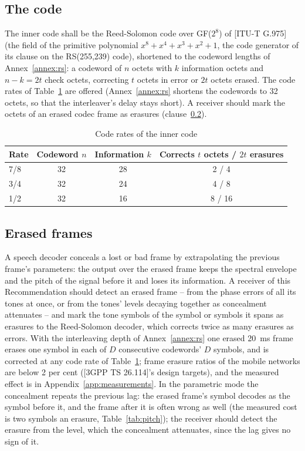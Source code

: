 \documentclass[a4paper,11pt]{article}
\newcounter{annex}
\newcommand{\rec}[1]{[ITU-T #1]}
\newcommand{\tgpp}[1]{[3GPP TS #1]}
\newcommand{\thd}[1]{\textbf{#1}}
\begin{document}
\subsection{The code}
The inner code shall be the Reed-Solomon code over GF($2^8$) of
\rec{G.975} (the field of the primitive polynomial $x^8+x^4+x^3+x^2+1$,
the code generator of its clause on the RS(255,239) code), shortened to
the codeword lengths of Annex~\ref{annex:rs}: a codeword of $n$ octets
with $k$ information octets and $n-k = 2t$ check octets, correcting $t$
octets in error or $2t$ octets erased.  The code rates of
Table~\ref{tab:rates} are offered (Annex~\ref{annex:rs} shortens the
codewords to 32 octets, so that the interleaver's delay stays short).  A receiver should mark the octets of
an erased codec frame as erasures (clause~\ref{sec:erasure}).

\begin{table}[htbp]
\caption{Code rates of the inner code}
\label{tab:rates}
\small
\begin{tabular}{lccc}
\toprule
\rowcolor{ituhead}\thd{Rate} & \thd{Codeword $n$} & \thd{Information $k$} & \thd{Corrects $t$ octets / $2t$ erasures} \\
\midrule
7/8 & 32 & 28 & 2 / 4 \\
3/4 & 32 & 24 & 4 / 8 \\
1/2 & 32 & 16 & 8 / 16 \\
\bottomrule
\end{tabular}
\end{table}

\subsection{Erased frames}\label{sec:erasure}
A speech decoder conceals a lost or bad frame by extrapolating the
previous frame's parameters: the output over the erased frame keeps the
spectral envelope and the pitch of the signal before it and loses its
information.  A receiver of this Recommendation should detect an erased
frame -- from the phase errors of all its tones at once, or from the
tones' levels decaying together as concealment attenuates -- and mark the
tone symbols of the symbol or symbols it spans as erasures to the
Reed-Solomon decoder, which corrects twice as many erasures as errors.
With the interleaving depth of Annex~\ref{annex:rs} one erased 20~ms
frame erases one symbol in each of $D$ consecutive codewords' $D$
symbols, and is corrected at any code rate of Table~\ref{tab:rates};
frame erasure ratios of the mobile networks are below 2 per cent
(\tgpp{26.114}'s design targets), and the measured effect is in
Appendix~\ref{app:measurements}.  In the parametric mode the concealment
repeats the previous lag: the erased frame's symbol decodes as the
symbol before it, and the frame after it is often wrong as well (the
measured cost is two symbols an erasure, Table~\ref{tab:pitch}); the
receiver should detect the erasure from the level, which the concealment
attenuates, since the lag gives no sign of it.
\end{document}
